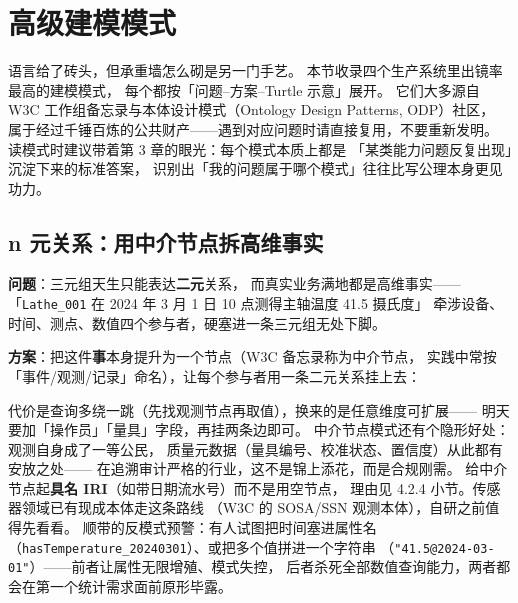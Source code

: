 \section{高级建模模式}

语言给了砖头，但承重墙怎么砌是另一门手艺。
本节收录四个生产系统里出镜率最高的建模模式，
每个都按「问题--方案--Turtle 示意」展开。
它们大多源自 W3C 工作组备忘录与本体设计模式（Ontology Design Patterns, ODP）社区，
属于经过千锤百炼的公共财产——遇到对应问题时请直接复用，不要重新发明。
读模式时建议带着第 3 章的眼光：每个模式本质上都是
「某类能力问题反复出现」沉淀下来的标准答案，
识别出「我的问题属于哪个模式」往往比写公理本身更见功力。

\subsection{n 元关系：用中介节点拆高维事实}

\textbf{问题}：三元组天生只能表达\textbf{二元}关系，
而真实业务满地都是高维事实——
「\texttt{Lathe\_001} 在 2024 年 3 月 1 日 10 点测得主轴温度 41.5 摄氏度」
牵涉设备、时间、测点、数值四个参与者，硬塞进一条三元组无处下脚。

\textbf{方案}：把这件\textbf{事}本身提升为一个节点（W3C 备忘录称为中介节点，
实践中常按「事件/观测/记录」命名），让每个参与者用一条二元关系挂上去：

\begin{codebox}
\codeline{\textcolor{cmtgray}{\#\ 「设备--时间--测点--数值」四元事实\ \(\rightarrow\)\ 一个观测节点\ +\ 四条二元边}}
\end{codebox}

代价是查询多绕一跳（先找观测节点再取值），换来的是任意维度可扩展——
明天要加「操作员」「量具」字段，再挂两条边即可。
中介节点模式还有个隐形好处：观测自身成了一等公民，
质量元数据（量具编号、校准状态、置信度）从此都有安放之处——
在追溯审计严格的行业，这不是锦上添花，而是合规刚需。
给中介节点起\textbf{具名 IRI}（如带日期流水号）而不是用空节点，
理由见 4.2.4 小节。传感器领域已有现成本体走这条路线
（W3C 的 SOSA/SSN 观测本体），自研之前值得先看看。
顺带的反模式预警：有人试图把时间塞进属性名
（\texttt{hasTemperature\_20240301}）、或把多个值拼进一个字符串
（\texttt{"41.5@2024-03-01"}）——前者让属性无限增殖、模式失控，
后者杀死全部数值查询能力，两者都会在第一个统计需求面前原形毕露。

